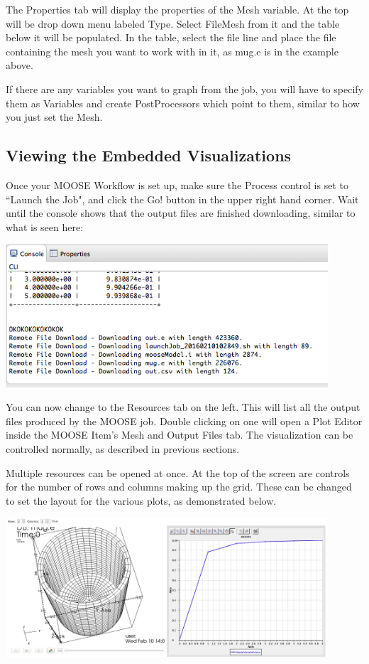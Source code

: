\documentclass{article}
\begin{document}
The Properties tab will display the properties of the Mesh variable. At the top
will be drop down menu labeled Type. Select FileMesh from it and the table below
it will be populated. In the table, select the file line and place the file
containing the mesh you want to work with in it, as mug.e is in the example
above.

If there are any variables you want to graph from the job, you will have to
specify them as Variables and create PostProcessors which point to them,
similar to how you just set the Mesh. 

\subsection{Viewing the Embedded Visualizations} 

Once your MOOSE Workflow is set up, make sure the Process control is set to
``Launch the Job", and click the Go! button in the upper right hand corner. Wait
until the console shows that the output files are finished downloading, similar
to what is seen here:

\begin{center} 
\includegraphics[width=12cm]{images/MOOSEJobConsoleOutput} 
\end{center}

You can now change to the Resources tab on the left. This will list all the
output files produced by the MOOSE job. Double clicking on one will open a Plot
Editor inside the MOOSE Item's Mesh and Output Files tab. The visualization can
be controlled normally, as described in previous sections.  

Multiple resources can be opened at once. At the top of the screen are controls
for the number of rows and columns making up the grid. These can be changed to
set the layout for the various plots, as demonstrated below.

\begin{center}
\includegraphics[width=12cm]{images/MOOSEEmbeddedHorizontal}
\end{center}
\end{document}
